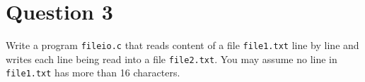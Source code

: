 
\section*{Question 3}

Write a program \texttt{fileio.c} that reads content of a file \texttt{file1.txt} line by line and writes each line being read into a file \texttt{file2.txt}.
You may assume no line in \texttt{file1.txt} has more than 16 characters.
